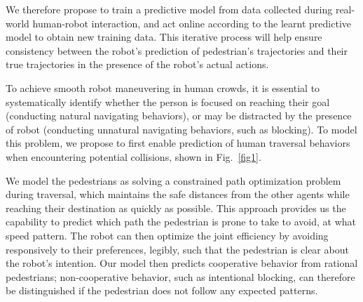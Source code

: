 \documentclass[conference]{IEEEtran}
\begin{document}
We therefore propose to train a predictive model from 
data collected during real-world human-robot interaction, and 
act online according to the learnt predictive model to obtain new training data. 
This iterative process will help ensure consistency between the robot's 
prediction of pedestrian's trajectories and their true trajectories in the 
presence of the robot's actual actions.


To achieve smooth robot maneuvering in human crowds, it is essential to 
systematically identify whether the person is focused on 
reaching their goal (conducting natural navigating behaviors), or may be 
distracted by the presence of robot (conducting unnatural navigating 
behaviors, such as blocking). To model this problem, we propose to first 
enable prediction of human traversal behaviors when encountering potential 
collisions, shown in Fig.~\ref{fig1}. 



We model the pedestrians as solving a constrained path optimization 
problem during traversal, which maintains the safe distances from the other agents while reaching 
their destination as quickly as possible. This approach provides us the 
capability to predict which path the 
pedestrian is prone to take to avoid, at what speed pattern. The robot can 
then optimize the joint efficiency by avoiding responsively to their 
preferences, legibly, such that the pedestrian 
is clear about the robot's intention. Our model then predicts cooperative behavior from rational pedestrians; non-cooperative behavior, such as intentional blocking, can therefore be distinguished if the pedestrian does not follow any expected patterns.
\end{document}
